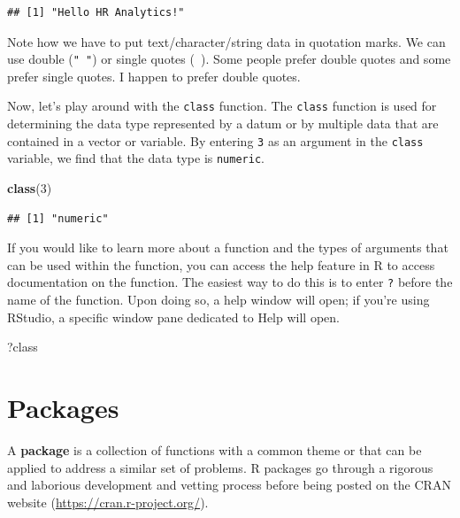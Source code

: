 \documentclass[]{book}
\newenvironment{Shaded}{\begin{snugshade}}{\end{snugshade}}
\newcommand{\KeywordTok}[1]{\textcolor[rgb]{0.13,0.29,0.53}{\textbf{#1}}}
\newcommand{\DecValTok}[1]{\textcolor[rgb]{0.00,0.00,0.81}{#1}}
\newcommand{\NormalTok}[1]{#1}
\begin{document}
\begin{verbatim}
## [1] "Hello HR Analytics!"
\end{verbatim}

Note how we have to put text/character/string data in quotation marks.
We can use double (\texttt{"\ "}) or single quotes
(\texttt{\textquotesingle{}\ \textquotesingle{}}). Some people prefer
double quotes and some prefer single quotes. I happen to prefer double
quotes.

Now, let's play around with the \texttt{class} function. The
\texttt{class} function is used for determining the data type
represented by a datum or by multiple data that are contained in a
vector or variable. By entering \texttt{3} as an argument in the
\texttt{class} variable, we find that the data type is \texttt{numeric}.

\begin{Shaded}
\begin{Highlighting}[]
\KeywordTok{class}\NormalTok{(}\DecValTok{3}\NormalTok{)}
\end{Highlighting}
\end{Shaded}

\begin{verbatim}
## [1] "numeric"
\end{verbatim}

If you would like to learn more about a function and the types of
arguments that can be used within the function, you can access the help
feature in R to access documentation on the function. The easiest way to
do this is to enter \texttt{?} before the name of the function. Upon
doing so, a help window will open; if you're using RStudio, a specific
window pane dedicated to Help will open.

\begin{Shaded}
\begin{Highlighting}[]
\NormalTok{?class}
\end{Highlighting}
\end{Shaded}

\hypertarget{packages}{\section{Packages}\label{packages}}

A \textbf{package} is a collection of functions with a common theme or
that can be applied to address a similar set of problems. R packages go
through a rigorous and laborious development and vetting process before
being posted on the CRAN website (\url{https://cran.r-project.org/}).
\end{document}
